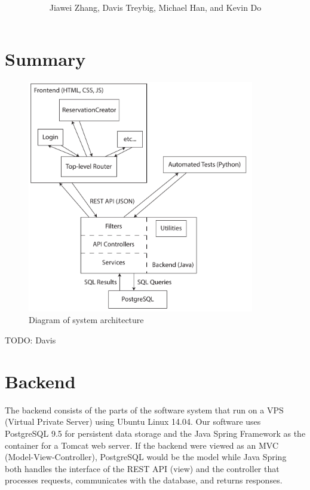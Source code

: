 \documentclass[12pt]{article}
\title{\horrule{5pt}\\\vspace{0.4cm}{\bf \mytitle}\\}
\author{Jiawei Zhang, Davis Treybig, Michael Han, and Kevin Do}
\date{\horrule{1pt}}
\begin{document}
\maketitle{}
\section{Summary}
\begin{figure}[h]
\begin{center}
\includegraphics[height=4in]{design_cropped.pdf}
\end{center}
\caption{Diagram of system architecture}
\label{fig:design}
\end{figure}

TODO: Davis

\section{Backend}
The backend consists of the parts of the software system that run on a VPS (Virtual Private Server) using Ubuntu Linux 14.04. Our software uses PostgreSQL 9.5 for persistent data storage and the Java Spring Framework as the container for a Tomcat web server. If the backend were viewed as an MVC (Model-View-Controller), PostgreSQL would be the model while Java Spring both handles the interface of the REST API (view) and the controller that processes requests, communicates with the database, and returns responses. 
\end{document}

